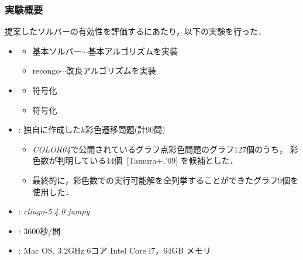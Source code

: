 \documentclass[dvipdfmx,11pt]{beamer}
\begin{document}
\begin{frame}\frametitle{実験概要}
  \begin{block}{}\centering
    提案したソルバーの有効性を評価するにあたり，以下の実験を行った．
  \end{block}
  \bigskip
  \begin{itemize}
  \item {}
    \begin{itemize}
    \item 基本ソルバー$\cdots$基本アルゴリズムを実装
    \item recongo$\cdots$改良アルゴリズムを実装
    \end{itemize}
  \item {}
    \begin{itemize}
    \item {}符号化
    \item {}符号化
    \end{itemize}
  \item {}: 独自に作成した$k$彩色遷移問題(計90問)
    \begin{itemize}
    \item \textit{COLOR04}で公開されているグラフ点彩色問題のグラフ127個のうち，
      彩色数が判明している44個~[Tamura+,'09] を候補とした．
    \item 最終的に，彩色数での実行可能解を全列挙することができたグラフ9個を使用した．
    \end{itemize}
    \item {}: \textit{clingo-5.4.0} \textit{jumpy}
    \item {}: 3600秒/問
    \item {}: Mac OS, 3.2GHz 6コア Intel Core i7，64GB メモリ
    \end{itemize}
\end{frame}
\end{document}
